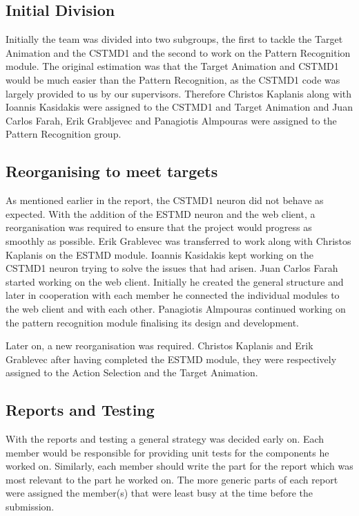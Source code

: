 \documentclass[a4paper,11pt]{article}
\begin{document}
\subsection{Initial Division}
Initially the team was divided into two subgroups, the first to tackle the Target Animation and the CSTMD1 and the second to work on the Pattern Recognition module. The original estimation was that the Target Animation and CSTMD1 would be much easier than the Pattern Recognition, as the CSTMD1 code was largely provided to us by our supervisors. Therefore Christos Kaplanis along with Ioannis Kasidakis were assigned to the CSTMD1 and Target Animation and Juan Carlos Farah, Erik Grabljevec and Panagiotis Almpouras were assigned to the Pattern Recognition group.

\subsection{Reorganising to meet targets}
As mentioned earlier in the report, the CSTMD1 neuron did not behave as expected. With the addition of the ESTMD neuron and the web client, a reorganisation was required to ensure that the project would progress as smoothly as possible. Erik Grablevec was transferred to work along with Christos Kaplanis on the ESTMD module. Ioannis Kasidakis kept working on the CSTMD1 neuron trying to solve the issues that had arisen. Juan Carlos Farah started working on the web client. Initially he created the general structure and later in cooperation with each member he connected the individual modules to the web client and with each other. Panagiotis Almpouras continued working on the pattern recognition module finalising its design and development.

Later on, a new reorganisation was required. Christos Kaplanis  and Erik Grablevec after having completed the ESTMD module, they were respectively assigned to the Action Selection and the Target Animation.

\subsection{Reports and Testing}
With the reports and testing a general strategy was decided early on. Each member would be responsible for providing unit tests for the components he worked on. Similarly, each member should write the part for the report which was most relevant to the part he worked on. The more generic parts of each report were assigned the member(s) that were least busy at the time before the submission.
\end{document}
